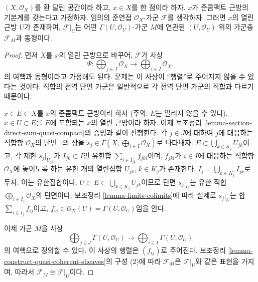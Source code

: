 \begin{lemma}
\label{lemma-quasi-coherent-module}
$(X, \mathcal{O}_X)$를 환 달린 공간이라 하고, $x \in X$를 한 점이라 하자.
$x$가 준콤팩트 근방의 기본계를 갖는다고 가정하자.
임의의 준연접 $\mathcal{O}_X$-가군 $\mathcal{F}$를 생각하자.
그러면 $x$의 열린 근방 $U$가 존재하여, $\mathcal{F}|_U$는
어떤 $\Gamma(U, \mathcal{O}_U)$-가군 $M$에 연관된
$(U, \mathcal{O}_U)$ 위의 가군층 $\mathcal{F}_M$과 동형이다.
\end{lemma}

\begin{proof}
먼저 $X$를 $x$의 열린 근방으로 바꾸어, $\mathcal{F}$가 사상
$$
\Psi :
\bigoplus\nolimits_{j \in J}
\mathcal{O}_X
\longrightarrow
\bigoplus\nolimits_{i \in I}
\mathcal{O}_X.
$$
의 여핵과 동형이라고 가정해도 된다.
문제는 이 사상이 “행렬”로 주어지지 않을 수 있다는 것이다.
직합의 전역 단면 가군은 일반적으로 각 전역 단면 가군의 직합과 다르기 때문이다.

\medskip\noindent
$x \in E \subset X$를 $x$의 준콤팩트 근방이라 하자
(주의: $E$는 열리지 않을 수 있다).
$x \in U \subset E$를 $E$에 포함되는 $x$의 열린 근방이라 하자.
이제 보조정리 \ref{lemma-section-direct-sum-quasi-compact}의 증명과 같이 진행한다.
각 $j \in J$에 대하여 $j$에 대응하는 직합항 $\mathcal{O}_X$의
단면 $1$의 상을
$s_j \in \Gamma(X, \bigoplus\nolimits_{i \in I} \mathcal{O}_X)$로 나타내자.
$E \subset \bigcup_{k \in K_j} U_{jk}$이고, 각 제한 $s_j|_{U_{jk}}$가
$I_{jk} \subset I$인 유한합 $\sum_{i \in I_{jk}} f_{jki}$이며,
$f_{jki}$가 $i \in I$에 대응하는 직합항 $\mathcal{O}_X$에 놓이도록 하는
유한 개의 열린집합 $U_{jk}$, $k \in K_j$가 존재한다.
$I_j = \bigcup_{k \in K_j} I_{jk}$로 두자. 이는 유한집합이다.
$U \subset E \subset \bigcup_{k \in K_j} U_{jk}$이므로 단면 $s_j|_U$는
유한 직합 $\bigoplus_{i \in I_j} \mathcal{O}_X$의 단면이다.
보조정리 \ref{lemma-limits-colimits}에 따라 실제로 $s_j|_U$는
합 $\sum_{i \in I_j} f_{ij}$이고,
$f_{ij} \in \mathcal{O}_X(U) = \Gamma(U, \mathcal{O}_U)$임을 안다.

\medskip\noindent
이제 가군 $M$을 사상
$$
\bigoplus\nolimits_{j \in J}
\Gamma(U, \mathcal{O}_U)
\longrightarrow
\bigoplus\nolimits_{i \in I}
\Gamma(U, \mathcal{O}_U)
$$
의 여핵으로 정의할 수 있다. 이 사상의 행렬은 $(f_{ij})$로 주어진다.
보조정리 \ref{lemma-construct-quasi-coherent-sheaves}의 구성 (2)에 따라
$\mathcal{F}_M$은 $\mathcal{F}|_U$와 같은 표현을 가지며, 따라서
$\mathcal{F}_M \cong \mathcal{F}|_U$이다.
\end{proof}

